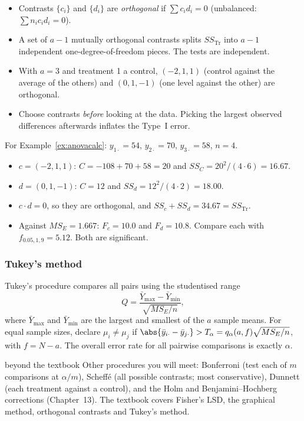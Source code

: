 \begin{itemize}
  \item Contrasts $\{c_i\}$ and $\{d_i\}$ are \emph{orthogonal} if $\sum c_id_i=0$ (unbalanced: $\sum n_ic_id_i=0$).
  \item A set of $a-1$ mutually orthogonal contrasts splits $SS_{\mathrm{Tr}}$ into $a-1$ independent one-degree-of-freedom pieces. The tests are independent.
  \item With $a=3$ and treatment 1 a control, $(-2,1,1)$ (control against the average of the others) and $(0,1,-1)$ (one level against the other) are orthogonal.
  \item Choose contrasts \emph{before} looking at the data. Picking the largest observed differences afterwards inflates the Type~I error.
\end{itemize}

\begin{example}
For Example~\ref{ex:anovacalc}: $y_{1\cdot}=54$, $y_{2\cdot}=70$, $y_{3\cdot}=58$, $n=4$.
\begin{itemize}
  \item $c=(-2,1,1)$: $C=-108+70+58=20$ and $SS_C=20^2/(4\cdot6)=16.67$.
  \item $d=(0,1,-1)$: $C=12$ and $SS_d=12^2/(4\cdot2)=18.00$.
  \item $c\cdot d=0$, so they are orthogonal, and $SS_c+SS_d=34.67=SS_{\mathrm{Tr}}$.
  \item Against $MS_E=1.667$: $F_c=10.0$ and $F_d=10.8$. Compare each with $f_{0.05,1,9}=5.12$. Both are significant.
\end{itemize}
\end{example}

\subsubsection*{Tukey's method}

Tukey's procedure compares all pairs using the studentised range
\[ Q=\frac{\bar{Y}_{\max}-\bar{Y}_{\min}}{\sqrt{MS_E/n}}, \]
where $\bar{Y}_{\max}$ and $\bar{Y}_{\min}$ are the largest and smallest of the $a$ sample means. For equal sample sizes, declare $\mu_i\ne\mu_j$ if $\abs{\bar{y}_{i\cdot}-\bar{y}_{j\cdot}}>T_\alpha=q_\alpha(a,f)\sqrt{MS_E/n}$, with $f=N-a$. The overall error rate for all pairwise comparisons is exactly $\alpha$.

\begin{interview}{beyond the textbook}
Other procedures you will meet: Bonferroni (test each of $m$ comparisons at $\alpha/m$), Scheff\'e (all possible contrasts; most conservative), Dunnett (each treatment against a control), and the Holm and Benjamini--Hochberg corrections (Chapter~13). The textbook covers Fisher's LSD, the graphical method, orthogonal contrasts and Tukey's method.
\end{interview}

